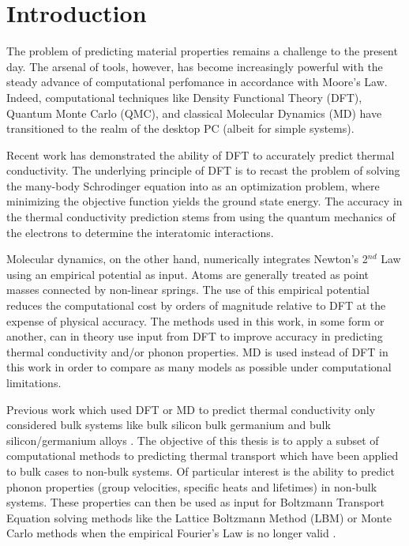 \chapter{Introduction}
The problem of predicting material properties remains a challenge to the present day. The arsenal of tools, however, has become increasingly powerful with the steady advance of computational perfomance in accordance with Moore's Law. Indeed, computational techniques like Density Functional Theory (DFT), Quantum Monte Carlo (QMC), and classical Molecular Dynamics (MD) have transitioned to the realm of the desktop PC (albeit for simple systems).

Recent work has demonstrated the ability of DFT \cite{broido1,PhysRevB.84.085204} to accurately predict thermal conductivity. The underlying principle of DFT is to recast the problem of solving the many-body Schrodinger equation into as an optimization problem, where minimizing the objective function yields the ground state energy. The accuracy in the thermal conductivity prediction stems from using the quantum mechanics of the electrons to determine the interatomic interactions.

Molecular dynamics, on the other hand, numerically integrates Newton's 2$^{nd}$ Law using an empirical potential as input. Atoms are generally treated as point masses connected by non-linear springs. The use of this empirical potential reduces the computational cost by orders of magnitude relative to DFT at the expense of physical accuracy. The methods used in this work, in some form or another, can in theory use input from DFT to improve accuracy in predicting thermal conductivity and/or phonon properties. MD is used instead of DFT in this work in order to compare as many models as possible under computational limitations.

Previous work which used DFT or MD to predict thermal conductivity only considered bulk systems like bulk silicon \cite{PhysRevB.84.085204} bulk germanium \cite{broido2007intrinsic} and bulk silicon/germanium alloys \cite{garg2011role}. The objective of this thesis is to apply a subset of computational methods to predicting thermal transport which have been applied to bulk cases to non-bulk systems. Of particular interest is the ability to predict phonon properties (group velocities, specific heats and lifetimes) in non-bulk systems. These properties can then be used as input for Boltzmann Transport Equation solving methods like the Lattice Boltzmann Method (LBM) \cite{escobar2006multi,smith2006lattice,nabovati2011lattice} or Monte Carlo methods \cite{mazumder2001monte, lacroix2005monte, peraud2011efficient} when the empirical Fourier's Law is no longer valid \cite{cahill2003nanoscale}. %

